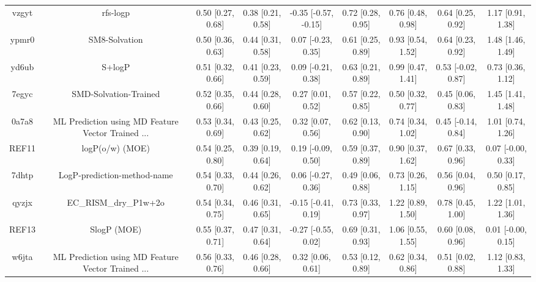 \documentclass{article}
\begin{document}
\begin{center}
\begin{longtable}{|ccccccccc|}
 vzgyt &                                           rfs-logp &  0.50 [0.27, 0.68] &  0.38 [0.21, 0.58] &  -0.35 [-0.57, -0.15] &  0.72 [0.28, 0.95] &    0.76 [0.48, 0.98] &    0.64 [0.25, 0.92] &     1.17 [0.91, 1.38] \\
 ypmr0 &                                      SM8-Solvation &  0.50 [0.36, 0.63] &  0.44 [0.31, 0.58] &    0.07 [-0.23, 0.35] &  0.61 [0.25, 0.89] &    0.93 [0.54, 1.52] &    0.64 [0.23, 0.92] &     1.48 [1.46, 1.49] \\
 yd6ub &                                             S+logP &  0.51 [0.32, 0.66] &  0.41 [0.23, 0.59] &    0.09 [-0.21, 0.38] &  0.63 [0.21, 0.89] &    0.99 [0.47, 1.41] &   0.53 [-0.02, 0.87] &     0.73 [0.36, 1.12] \\
 7egyc &                              SMD-Solvation-Trained &  0.52 [0.35, 0.66] &  0.44 [0.28, 0.60] &     0.27 [0.01, 0.52] &  0.57 [0.22, 0.85] &    0.50 [0.32, 0.77] &    0.45 [0.06, 0.83] &     1.45 [1.41, 1.48] \\
 0a7a8 &  ML Prediction using MD Feature Vector Trained ... &  0.53 [0.34, 0.69] &  0.43 [0.25, 0.62] &     0.32 [0.07, 0.56] &  0.62 [0.13, 0.90] &    0.74 [0.34, 1.02] &   0.45 [-0.14, 0.84] &     1.01 [0.74, 1.26] \\
 REF11 &                                    logP(o/w) (MOE) &  0.54 [0.25, 0.80] &  0.39 [0.19, 0.64] &    0.19 [-0.09, 0.50] &  0.59 [0.37, 0.89] &    0.90 [0.37, 1.62] &    0.67 [0.33, 0.96] &    0.07 [-0.00, 0.33] \\
 7dhtp &                        LogP-prediction-method-name &  0.54 [0.33, 0.70] &  0.44 [0.26, 0.62] &    0.06 [-0.27, 0.36] &  0.49 [0.06, 0.88] &    0.73 [0.26, 1.15] &    0.56 [0.04, 0.96] &     0.50 [0.17, 0.85] \\
 qyzjx &                              EC\_RISM\_dry\_P1w+2o &  0.54 [0.34, 0.75] &  0.46 [0.31, 0.65] &   -0.15 [-0.41, 0.19] &  0.73 [0.33, 0.97] &    1.22 [0.89, 1.50] &    0.78 [0.45, 1.00] &     1.22 [1.01, 1.36] \\
 REF13 &                                        SlogP (MOE) &  0.55 [0.37, 0.71] &  0.47 [0.31, 0.64] &   -0.27 [-0.55, 0.02] &  0.69 [0.31, 0.93] &    1.06 [0.55, 1.55] &    0.60 [0.08, 0.96] &    0.01 [-0.00, 0.15] \\
 w6jta &  ML Prediction using MD Feature Vector Trained ... &  0.56 [0.33, 0.76] &  0.46 [0.28, 0.66] &     0.32 [0.06, 0.61] &  0.53 [0.12, 0.89] &    0.62 [0.34, 0.86] &    0.51 [0.02, 0.88] &     1.12 [0.83, 1.33] \\

\end{longtable}
\end{center}
\end{document}
